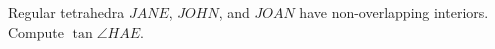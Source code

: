 Regular tetrahedra $JANE$, $JOHN$, and $JOAN$ have non-overlapping interiors. Compute $\tan\angle{HAE}$.